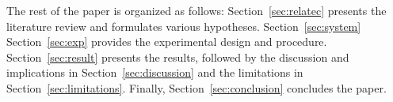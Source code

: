     


The rest of the paper is organized as follows:
Section~\ref{sec:relatec} presents the literature review and formulates various hypotheses.
Section~\ref{sec:system} 
Section~\ref{sec:exp} provides the experimental design and procedure.
Section~\ref{sec:result} presents the results, followed by the discussion and implications in Section~\ref{sec:discussion} and the limitations in Section~\ref{sec:limitations}.
Finally, Section~\ref{sec:conclusion} concludes the paper.
